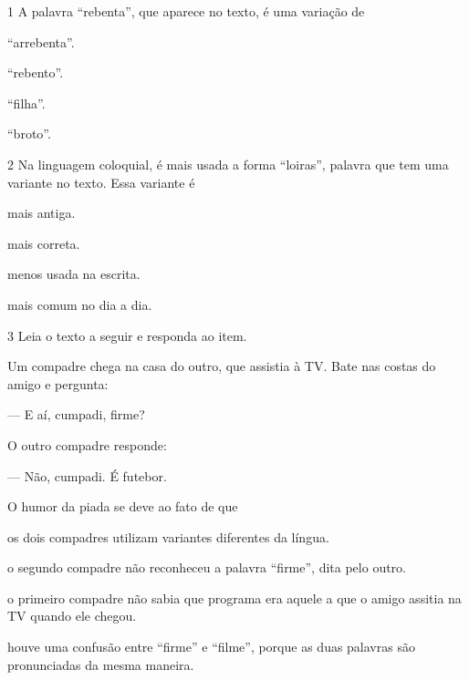 \num{1} A palavra ``rebenta'', que aparece no texto, é uma variação de

\begin{escolha}[itemsep=-5pt]
\item ``arrebenta''.

\item ``rebento''.

\item ``filha''.

\item ``broto''.
\end{escolha}

\num{2} Na linguagem coloquial, é mais usada a forma ``loiras'', palavra que tem uma variante no texto. Essa variante é

\begin{escolha}[itemsep=-5pt]
\item mais antiga.

\item mais correta.

\item menos usada na escrita.

\item mais comum no dia a dia.
\end{escolha}

\num{3} Leia o texto a seguir e responda ao item.

\begin{myquote}
Um compadre chega na casa do outro, que assistia à TV. Bate nas costas do amigo e pergunta:

--- E aí, cumpadi, firme?

O outro compadre responde:

--- Não, cumpadi. É futebor.

\end{myquote}

O humor da piada se deve ao fato de que

\begin{escolha}[itemsep=-5pt]
\item os dois compadres utilizam variantes diferentes da língua.

\item o segundo compadre não reconheceu a palavra ``firme'', dita pelo outro.

\item o primeiro compadre não sabia que programa era aquele a que o amigo assitia na TV quando ele chegou.

\item houve uma confusão entre ``firme'' e ``filme'', porque as duas palavras são pronunciadas da mesma maneira.
\end{escolha}

